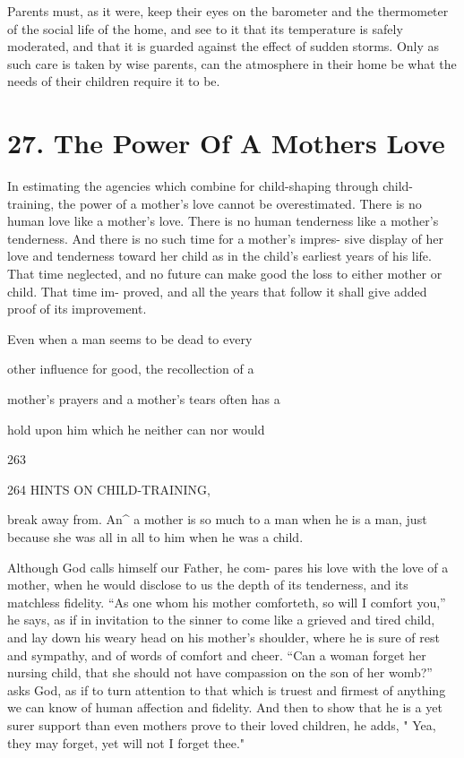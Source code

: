 \documentclass[
]{book}
\begin{document}
Parents must, as it were, keep their eyes on the barometer and the thermometer of the social life of the home, and see to it that its temperature is safely moderated, and that it is guarded against the effect of sudden storms. Only as such care is taken by wise parents, can the atmosphere in their home be what the needs of their children require it to be.

\hypertarget{the-power-of-a-mothers-love}{%
\chapter{27. The Power Of A Mothers Love}\label{the-power-of-a-mothers-love}}

In estimating the agencies which combine for child-shaping through child-training, the power of a mother's love cannot be overestimated. There is no human love like a mother's love. There is no human tenderness like a mother's tenderness. And there is no such time for a mother's impres- sive display of her love and tenderness toward her child as in the child's earliest years of his life. That time neglected, and no future can make good the loss to either mother or child. That time im- proved, and all the years that follow it shall give added proof of its improvement.

Even when a man seems to be dead to every

other influence for good, the recollection of a

mother's prayers and a mother's tears often has a

hold upon him which he neither can nor would

263

264 HINTS ON CHILD-TRAINING,

break away from. An\^{} a mother is so much to a man when he is a man, just because she was all in all to him when he was a child.

Although God calls himself our Father, he com- pares his love with the love of a mother, when he would disclose to us the depth of its tenderness, and its matchless fidelity. ``As one whom his mother comforteth, so will I comfort you,'' he says, as if in invitation to the sinner to come like a grieved and tired child, and lay down his weary head on his mother's shoulder, where he is sure of rest and sympathy, and of words of comfort and cheer. ``Can a woman forget her nursing child, that she should not have compassion on the son of her womb?'' asks God, as if to turn attention to that which is truest and firmest of anything we can know of human affection and fidelity. And then to show that he is a yet surer support than even mothers prove to their loved children, he adds, " Yea, they may forget, yet will not I forget thee."
\end{document}
